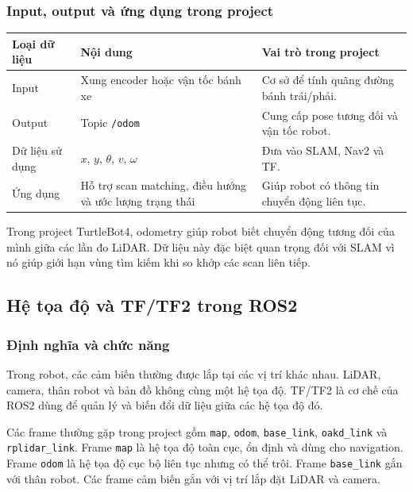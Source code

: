 \subsubsection{Input, output và ứng dụng trong project}

\renewcommand{\arraystretch}{1.25}
\begin{longtable}{|
  >{\raggedright\arraybackslash}p{}|
  >{\raggedright\arraybackslash}p{}|
  >{\raggedright\arraybackslash}p{}|}
\hline
\textbf{Loại dữ liệu} & \textbf{Nội dung} & \textbf{Vai trò trong project} \\ \hline
\hline
\endhead
\hline
\endlastfoot
Input & Xung encoder hoặc vận tốc bánh xe & Cơ sở để tính quãng đường
bánh trái/phải. \\ \hline
Output & Topic \texttt{/odom} & Cung cấp pose tương đối và vận tốc
robot. \\ \hline
Dữ liệu sử dụng & \(x\), \(y\), \(\theta\), \(v\), \(\omega\) & Đưa vào
SLAM, Nav2 và TF. \\ \hline
Ứng dụng & Hỗ trợ scan matching, điều hướng và ước lượng trạng thái &
Giúp robot có thông tin chuyển động liên tục. \\ \hline
\end{longtable}

Trong project TurtleBot4, odometry giúp robot biết chuyển động tương đối
của mình giữa các lần đo LiDAR. Dữ liệu này đặc biệt quan trọng đối với
SLAM vì nó giúp giới hạn vùng tìm kiếm khi so khớp các scan liên tiếp.

\subsection{Hệ tọa độ và TF/TF2 trong ROS2}\label{subsec:tf2}

\subsubsection{Định nghĩa và chức năng}

Trong robot, các cảm biến thường được lắp tại các vị trí khác nhau.
LiDAR, camera, thân robot và bản đồ không cùng một hệ tọa độ. TF/TF2 là
cơ chế của ROS2 dùng để quản lý và biến đổi dữ liệu giữa các hệ tọa độ
đó.

Các frame thường gặp trong project gồm \texttt{map}, \texttt{odom},
\texttt{base\_link}, \texttt{oakd\_link} và \texttt{rplidar\_link}.
Frame \texttt{map} là hệ tọa độ toàn cục, ổn định và dùng cho
navigation. Frame \texttt{odom} là hệ tọa độ cục bộ liên tục nhưng có
thể trôi. Frame \texttt{base\_link} gắn với thân robot. Các frame cảm
biến gắn với vị trí lắp đặt LiDAR và camera.

